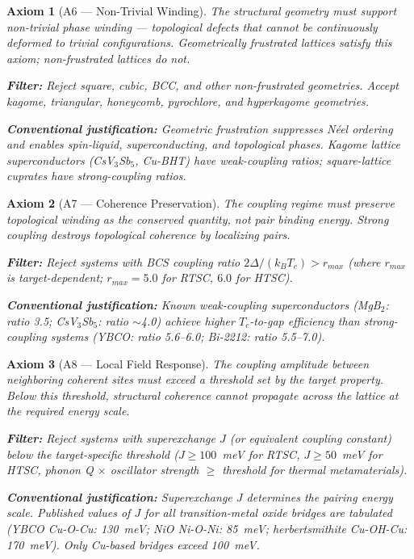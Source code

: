 \documentclass[11pt, a4paper]{article}
\newtheorem{axiom}{Axiom}[section]
\begin{document}
\begin{axiom}[A6 --- Non-Trivial Winding]
\label{ax:a6}
The structural geometry must support non-trivial phase winding
--- topological defects that cannot be continuously deformed to
trivial configurations. Geometrically frustrated lattices
satisfy this axiom; non-frustrated lattices do not.

\textbf{Filter:} Reject square, cubic, BCC, and other
non-frustrated geometries. Accept kagome, triangular,
honeycomb, pyrochlore, and hyperkagome geometries.

\textbf{Conventional justification:} Geometric frustration
suppresses N\'eel ordering and enables spin-liquid,
superconducting, and topological phases. Kagome lattice
superconductors (CsV$_3$Sb$_5$, Cu-BHT) have weak-coupling
ratios; square-lattice cuprates have strong-coupling ratios.
\end{axiom}

\begin{axiom}[A7 --- Coherence Preservation]
\label{ax:a7}
The coupling regime must preserve topological winding as the
conserved quantity, not pair binding energy. Strong coupling
destroys topological coherence by localizing pairs.

\textbf{Filter:} Reject systems with BCS coupling ratio
$2\Delta/(k_B T_c) > r_{max}$ (where $r_{max}$ is
target-dependent; $r_{max} = 5.0$ for RTSC, $6.0$ for HTSC).

\textbf{Conventional justification:} Known weak-coupling
superconductors (MgB$_2$: ratio 3.5; CsV$_3$Sb$_5$: ratio
$\sim$4.0) achieve higher $T_c$-to-gap efficiency than
strong-coupling systems (YBCO: ratio 5.6--6.0; Bi-2212:
ratio 5.5--7.0).
\end{axiom}

\begin{axiom}[A8 --- Local Field Response]
\label{ax:a8}
The coupling amplitude between neighboring coherent sites
must exceed a threshold set by the target property. Below
this threshold, structural coherence cannot propagate across
the lattice at the required energy scale.

\textbf{Filter:} Reject systems with superexchange $J$ (or
equivalent coupling constant) below the target-specific
threshold ($J \geq 100$~meV for RTSC, $J \geq 50$~meV for
HTSC, phonon Q $\times$ oscillator strength $\geq$ threshold
for thermal metamaterials).

\textbf{Conventional justification:} Superexchange $J$
determines the pairing energy scale. Published values of $J$
for all transition-metal oxide bridges are tabulated (YBCO
Cu-O-Cu: 130~meV; NiO Ni-O-Ni: 85~meV; herbertsmithite
Cu-OH-Cu: 170~meV). Only Cu-based bridges exceed 100~meV.
\end{axiom}
\end{document}
